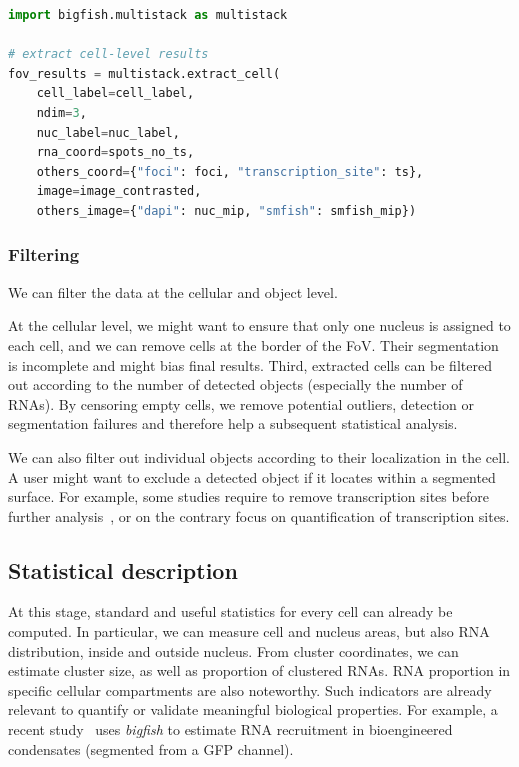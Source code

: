 \begin{minipage}{0.9\textwidth}
\begin{lstlisting}[language=Python]
import bigfish.multistack as multistack

# extract cell-level results
fov_results = multistack.extract_cell(
    cell_label=cell_label,
    ndim=3,
    nuc_label=nuc_label,
    rna_coord=spots_no_ts,
    others_coord={"foci": foci, "transcription_site": ts},
    image=image_contrasted,
    others_image={"dapi": nuc_mip, "smfish": smfish_mip})
\end{lstlisting}
\end{minipage}

\subsubsection{Filtering}

We can filter the data at the cellular and object level.

At the cellular level, we might want to ensure that only one nucleus is assigned to each cell, and we can remove cells at the border of the \ac{FoV}.
Their segmentation is incomplete and might bias final results.
Third, extracted cells can be filtered out according to the number of detected objects (especially the number of \ac{RNA}s).
By censoring empty cells, we remove potential outliers, detection or segmentation failures and therefore help a subsequent statistical analysis.

We can also filter out individual objects according to their localization in the cell.
A user might want to exclude a detected object if it locates within a segmented surface.
For example, some studies require to remove transcription sites before further analysis~\cite{CHOUAIB_2020}, or on the contrary focus on quantification of transcription sites.

\subsection{Statistical description}
\label{subsec:statistical_description}

At this stage, standard and useful statistics for every cell can already be computed.
In particular, we can measure cell and nucleus areas, but also \ac{RNA} distribution, inside and outside nucleus.
From cluster coordinates, we can estimate cluster size, as well as proportion of clustered \ac{RNA}s.
\ac{RNA} proportion in specific cellular compartments are also noteworthy.
Such indicators are already relevant to quantify or validate meaningful biological properties.
For example, a recent study~\cite{cochard_rna_2022} uses \emph{bigfish} to estimate \ac{RNA} recruitment in bioengineered condensates (segmented from a \ac{GFP} channel).\\

